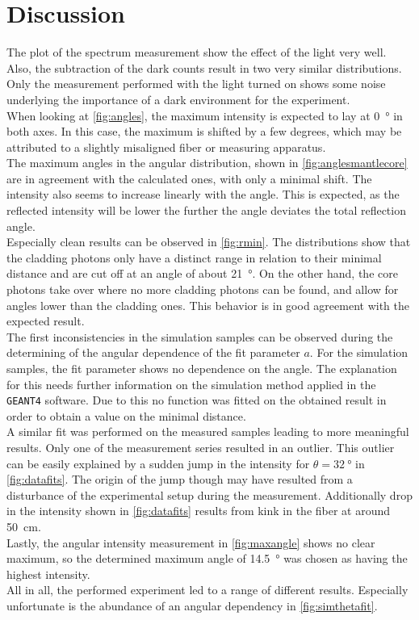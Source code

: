 \section{Discussion}
\label{sec:Discussion}

The plot of the spectrum measurement show the effect of the light very well. Also, the subtraction of the dark counts result in two very similar distributions. Only the measurement performed with the light turned on shows some noise underlying the importance of a dark environment for the experiment.\\
When looking at \autoref{fig:angles}, the maximum intensity is expected to lay at \qty{0}{\degree} in both axes. In this case, the maximum is shifted by a few degrees, which may be attributed to a slightly misaligned fiber or measuring apparatus.\\
The maximum angles in the angular distribution, shown in \autoref{fig:anglesmantlecore} are in agreement with the calculated ones, with only a minimal shift. 
The intensity also seems to increase linearly with the angle. This is expected, as the reflected intensity will be lower the further the angle deviates the total reflection angle.\\ %
Especially clean results can be observed in \autoref{fig:rmin}. The distributions show that the cladding photons only have a distinct range in relation to their minimal distance and are cut off at an angle of about \qty{21}{\degree}. On the other hand, the core photons take over where no more cladding photons can be found, and allow for angles lower than the cladding ones. This behavior is in good agreement with the expected result.\\
The first inconsistencies in the simulation samples can be observed during the determining of the angular dependence of the fit parameter $a$. For the simulation samples, the fit parameter shows no dependence on the angle. The explanation for this needs further information on the simulation method applied in the \texttt{GEANT4} software. Due to this no function was fitted on the obtained result in order to obtain a value on the minimal distance.\\
A similar fit was performed on the measured samples leading to more meaningful results. Only one of the measurement series resulted in an outlier. 
This outlier can be easily explained by a sudden jump in the intensity for $\theta=\qty{32}{\degree}$ in \autoref{fig:datafits}. 
The origin of the jump though may have resulted from a disturbance of the experimental setup during the measurement. 
Additionally drop in the intensity shown in \autoref{fig:datafits} results from kink in the fiber at around \qty{50}{\centi\meter}.\\
Lastly, the angular intensity measurement in \autoref{fig:maxangle} shows no clear maximum, so the determined maximum angle of \qty{14.5}{\degree} was chosen as having the highest intensity.\\
All in all, the performed experiment led to a range of different results. Especially unfortunate is the abundance of an angular dependency in \autoref{fig:simthetafit}.
